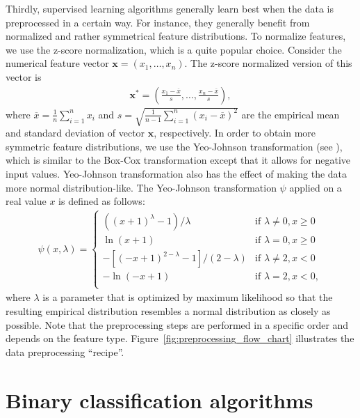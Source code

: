 \documentclass{article}
\begin{document}
Thirdly, supervised learning algorithms generally learn best when the data is preprocessed in a certain way. For instance, they generally benefit from normalized and rather symmetrical feature distributions. To normalize features, we use the z-score normalization, which is a quite popular choice. Consider the numerical feature vector $\boldsymbol{x} = (x_1, \dots, x_n)$. The z-score normalized version of this vector is 
\begin{align*}
    \boldsymbol{x}^* = \left(\frac{x_1 - \overline{x}}{s}, \dots, \frac{x_n - \overline{x}}{s}\right),
\end{align*}
where $\overline{x} = \frac{1}{n}\sum_{i = 1}^n x_i$ and $s = \sqrt{\frac{1}{n - 1}\sum_{i = 1}^n (x_i - \overline{x})^2}$ are the empirical mean and standard deviation of vector $\boldsymbol{x}$, respectively. In order to obtain more symmetric feature distributions, we use the Yeo-Johnson transformation (see \cite{yeo2000new}), which is similar to the Box-Cox transformation except that it allows for negative input values. Yeo-Johnson transformation also has the effect of making the data more normal distribution-like. The Yeo-Johnson transformation $\psi$ applied on a real value $x$ is defined as follows:
\begin{align*}
    \psi(x, \lambda) =
    \begin{cases}
      ((x + 1)^\lambda - 1)/\lambda & \text{if } \lambda \ne 0, x \ge 0\\
      \ln(x + 1) & \text{if } \lambda = 0, x \ge 0\\
      -[(-x + 1)^{2 - \lambda} - 1]/(2 - \lambda) & \text{if } \lambda \ne 2, x < 0\\
      -\ln(-x + 1) & \text{if } \lambda = 2, x < 0, \\
    \end{cases}
\end{align*}
where $\lambda$ is a parameter that is optimized by maximum likelihood so that the resulting empirical distribution resembles a normal distribution as closely as possible. Note that the preprocessing steps are performed in a specific order and depends on the feature type. Figure~\ref{fig:preprocessing_flow_chart} illustrates the data preprocessing ``recipe''.


\section{Binary classification algorithms}\label{sec:classification_algorhtms}
\end{document}
